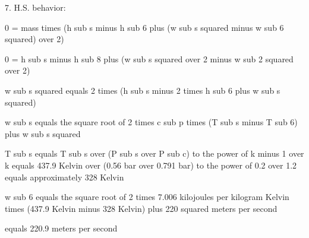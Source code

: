 7. H.S. behavior:

0 = mass times (h sub s minus h sub 6 plus (w sub s squared minus w sub 6 squared) over 2)

0 = h sub s minus h sub 8 plus (w sub s squared over 2 minus w sub 2 squared over 2)

w sub s squared equals 2 times (h sub s minus 2 times h sub 6 plus w sub s squared)

w sub s equals the square root of 2 times c sub p times (T sub s minus T sub 6) plus w sub s squared

T sub s equals T sub s over (P sub s over P sub c) to the power of k minus 1 over k equals 437.9 Kelvin over (0.56 bar over 0.791 bar) to the power of 0.2 over 1.2 equals approximately 328 Kelvin

w sub 6 equals the square root of 2 times 7.006 kilojoules per kilogram Kelvin times (437.9 Kelvin minus 328 Kelvin) plus 220 squared meters per second

equals 220.9 meters per second
